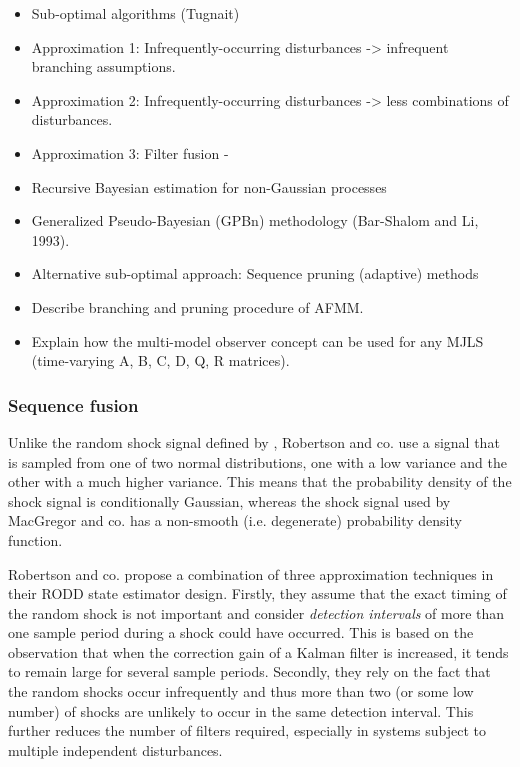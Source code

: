 \begin{itemize}
	\item Sub-optimal algorithms (Tugnait)
	\item Approximation 1: Infrequently-occurring disturbances -> infrequent branching assumptions.
	\item Approximation 2: Infrequently-occurring disturbances -> less combinations of disturbances.
	\item Approximation 3: Filter fusion - 
	\item Recursive Bayesian estimation for non-Gaussian processes
	\item Generalized Pseudo-Bayesian (GPBn) methodology (Bar-Shalom and Li, 1993).
	\item Alternative sub-optimal approach: Sequence pruning (adaptive) methods 
	\item Describe branching and pruning procedure of AFMM.
	\item Explain how the multi-model observer concept can be used for any MJLS (time-varying A, B, C, D, Q, R matrices).
\end{itemize}

\subsubsection{Sequence fusion} \label{subsec-fusion}

Unlike the random shock signal defined by \cite{macgregor_duality_1984}, Robertson and co. use a signal that is sampled from one of two normal distributions, one with a low variance and the other with a much higher variance. This means that the probability density of the shock signal is conditionally Gaussian, whereas the shock signal used by MacGregor and co. has a non-smooth (i.e. degenerate) probability density function.

Robertson and co. propose a combination of three approximation techniques in their RODD state estimator design. Firstly, they assume that the exact timing of the random shock is not important and consider \textit{detection intervals} of more than one sample period during a shock could have occurred. This is based on the observation that when the correction gain of a Kalman filter is increased, it tends to remain large for several sample periods. Secondly, they rely on the fact that the random shocks occur infrequently and thus more than two (or some low number) of shocks are unlikely to occur in the same detection interval. This further reduces the number of filters required, especially in systems subject to multiple independent disturbances. 

